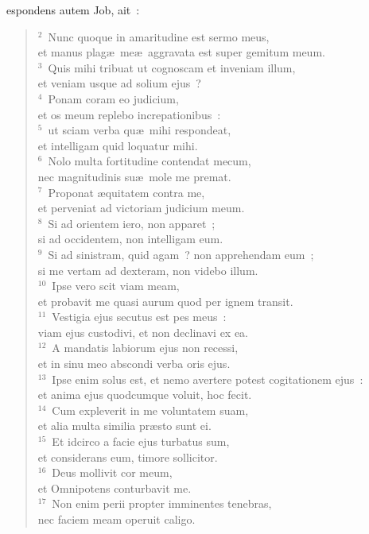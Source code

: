 \bchapter
{}espondens autem Job, ait~:
\begin{flushleft}\begin{verse}\vspace{6pt}${}^{2}$~Nunc quoque in amaritudine est sermo meus,\\ et manus plag\ae\ me\ae\ aggravata est super gemitum meum.\\
${}^{3}$~Quis mihi tribuat ut cognoscam et inveniam illum,\\ et veniam usque ad solium ejus~?\\
${}^{4}$~Ponam coram eo judicium,\\ et os meum replebo increpationibus~:\\
${}^{5}$~ut sciam verba qu\ae\ mihi respondeat,\\ et intelligam quid loquatur mihi.\\
${}^{6}$~Nolo multa fortitudine contendat mecum,\\ nec magnitudinis su\ae\ mole me premat.\\
${}^{7}$~Proponat \ae quitatem contra me,\\ et perveniat ad victoriam judicium meum.\\
${}^{8}$~Si ad orientem iero, non apparet~;\\ si ad occidentem, non intelligam eum.\\
${}^{9}$~Si ad sinistram, quid agam~? non apprehendam eum~;\\ si me vertam ad dexteram, non videbo illum.\\
${}^{10}$~Ipse vero scit viam meam,\\ et probavit me quasi aurum quod per ignem transit.\\
${}^{11}$~Vestigia ejus secutus est pes meus~:\\ viam ejus custodivi, et non declinavi ex ea.\\
${}^{12}$~A mandatis labiorum ejus non recessi,\\ et in sinu meo abscondi verba oris ejus.\\
${}^{13}$~Ipse enim solus est, et nemo avertere potest cogitationem ejus~:\\ et anima ejus quodcumque voluit, hoc fecit.\\
${}^{14}$~Cum expleverit in me voluntatem suam,\\ et alia multa similia pr\ae sto sunt ei.\\
${}^{15}$~Et idcirco a facie ejus turbatus sum,\\ et considerans eum, timore sollicitor.\\
${}^{16}$~Deus mollivit cor meum,\\ et Omnipotens conturbavit me.\\
${}^{17}$~Non enim perii propter imminentes tenebras,\\ nec faciem meam operuit caligo.\end{verse}\end{flushleft}


